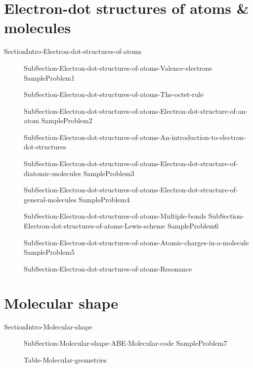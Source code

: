 \documentclass[main.tex]{subfiles}
\begin{document}
\section{Electron-dot structures of atoms \& molecules}{SectionIntro-Electron-dot-structures-of-atoms}
\sloppy\begin{description}
\item[] {SubSection-Electron-dot-structures-of-atoms-Valence-electrons}
{SampleProblem1}
\item[] {SubSection-Electron-dot-structures-of-atoms-The-octet-rule}
\item[] {SubSection-Electron-dot-structures-of-atoms-Electron-dot-structure-of-an-atom}
{SampleProblem2}
\item[] {SubSection-Electron-dot-structures-of-atoms-An-introduction-to-electron-dot-structures}

\item[] {SubSection-Electron-dot-structures-of-atoms-Electron-dot-structure-of-diatomic-molecules}
{SampleProblem3}
\item[] {SubSection-Electron-dot-structures-of-atoms-Electron-dot-structure-of-general-molecules}
{SampleProblem4}
\item[] {SubSection-Electron-dot-structures-of-atoms-Multiple-bonds}
{SubSection-Electron-dot-structures-of-atoms-Lewis-scheme}  
{SampleProblem6}
\item[] {SubSection-Electron-dot-structures-of-atoms-Atomic-charges-in-a-molecule}
{SampleProblem5}
\item[] {SubSection-Electron-dot-structures-of-atoms-Resonance}

\end{description}
\newpage

\section{Molecular shape}{SectionIntro-Molecular-shape}
\sloppy\begin{description}
\item[] {SubSection-Molecular-shape-ABE-Molecular-code}
{SampleProblem7}

{Table-Molecular-geometries}
\end{description}
\end{document}
